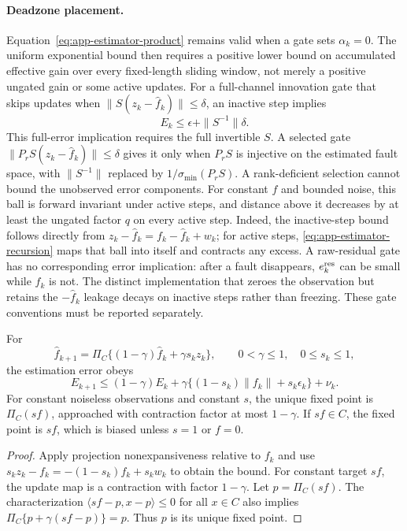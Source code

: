 \paragraph{Deadzone placement.}
Equation~\eqref{eq:app-estimator-product} remains valid when a gate sets
$\alpha_k=0$. The uniform exponential bound then requires a positive lower
bound on accumulated effective gain over every fixed-length sliding window,
not merely a positive ungated gain or some active updates.
For a full-channel innovation gate that skips updates when
$\|S(z_k-\widehat f_k)\|\le\delta$, an inactive step implies
\begin{equation}
 E_k\le\epsilon+\|S^{-1}\|\delta.
 \label{eq:app-deadzone}
\end{equation}
This full-error implication requires the full invertible $S$. A selected gate
$\|P_rS(z_k-\widehat f_k)\|\le\delta$ gives it only when $P_rS$ is
injective on the estimated fault space, with $\|S^{-1}\|$ replaced by
$1/\sigma_{\min}(P_rS)$. A rank-deficient selection cannot bound the
unobserved error components. For constant $f$ and bounded noise, this ball is forward invariant under
active steps, and distance above it decreases by at least the ungated factor
$q$ on every active step. Indeed, the inactive-step bound follows directly
from $z_k-\widehat f_k=f_k-\widehat f_k+w_k$; for active steps,
\eqref{eq:app-estimator-recursion} maps that ball into itself and contracts
any excess. A raw-residual gate has no corresponding error implication:
after a fault disappears, $e_k^{\rm res}$ can be small while $\widehat f_k$ is not.
The distinct implementation that zeroes the observation but retains the
$-\widehat f_k$ leakage decays on inactive steps rather than freezing. These
gate conventions must be reported separately.

\begin{proposition}
\label{prop:app-legacy}
For
\begin{equation}
 \widehat f_{k+1}=\Pi_C\{(1-\gamma)\widehat f_k+\gamma s_k z_k\},
 \qquad 0<\gamma\le1,\quad 0\le s_k\le1,
 \label{eq:app-legacy}
\end{equation}
the estimation error obeys
\begin{equation}
 E_{k+1}\le(1-\gamma)E_k+
 \gamma\{(1-s_k)\|f_k\|+s_k\epsilon_k\}+\nu_k.
 \label{eq:app-legacy-bound}
\end{equation}
For constant noiseless observations and constant $s$, the unique fixed point
is $\Pi_C(sf)$, approached with contraction factor at most $1-\gamma$.
If $sf\in C$, the fixed point is $sf$, which is biased unless $s=1$ or $f=0$.
\end{proposition}
\begin{proof}
Apply projection nonexpansiveness relative to $f_k$ and use
$s_kz_k-f_k=-(1-s_k)f_k+s_kw_k$ to obtain the bound. For constant target
$sf$, the update map is a contraction with factor $1-\gamma$.
Let $p=\Pi_C(sf)$. The characterization
$\langle sf-p,x-p\rangle\le0$ for all $x\in C$ also implies
$\Pi_C\{p+\gamma(sf-p)\}=p$. Thus $p$ is its unique fixed point.
\end{proof}

